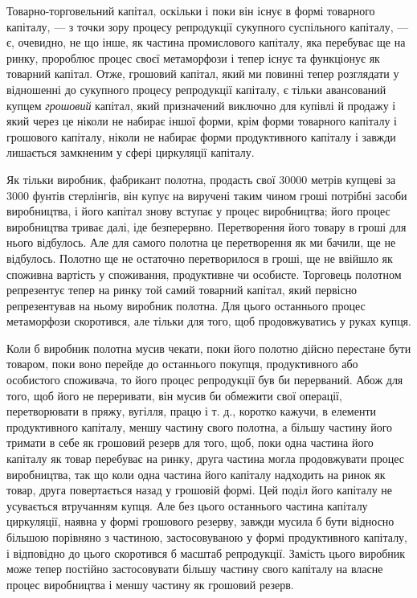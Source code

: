 Товарно-торговельний капітал, оскільки і поки він існує в формі
товарного капіталу, — з точки зору процесу репродукції сукупного суспільного капіталу, — є,
очевидно, не що інше, як
частина промислового капіталу, яка перебуває ще на ринку,
пророблює процес своєї метаморфози і тепер існує та функціонує як товарний капітал. Отже, грошовий
капітал, який ми
повинні тепер розглядати у відношенні до сукупного процесу
репродукції капіталу, є тільки авансований купцем \emph{грошовий}
капітал, який призначений виключно для купівлі й продажу
і який через це ніколи не набирає іншої форми, крім форми товарного капіталу і грошового капіталу,
ніколи не набирає форми
продуктивного капіталу і завжди лишається замкненим у сфері
циркуляції капіталу.

Як тільки виробник, фабрикант полотна, продасть свої 30000
метрів купцеві за 3000 фунтів стерлінгів, він купує на виручені таким чином гроші потрібні засоби
виробництва, і його капітал
знову вступає у процес виробництва; його процес виробництва
триває далі, іде безперервно. Перетворення його товару в гроші
для нього відбулось. Але для самого полотна це перетворення
як ми бачили, ще не відбулось. Полотно ще не остаточно перетворилося
в гроші, ще не ввійшло як споживна вартість у споживання,
продуктивне чи особисте. Торговець полотном репрезентує
тепер на ринку той самий товарний капітал, який первісно
репрезентував на ньому виробник полотна. Для цього
останнього процес метаморфози скоротився, але тільки для того,
щоб продовжуватись у руках купця.

Коли б виробник полотна мусив чекати, поки його полотно
дійсно перестане бути товаром, поки воно перейде до останнього
покупця, продуктивного або особистого споживача, то
його процес репродукції був би перерваний. Абож для того, щоб
його не переривати, він мусив би обмежити свої операції, перетворювати
в пряжу, вугілля, працю і т. д., коротко кажучи,
в елементи продуктивного капіталу, меншу частину свого полотна,
а більшу частину його тримати в себе як грошовий резерв
для того, щоб, поки одна частина його капіталу як товар
перебуває на ринку, друга частина могла продовжувати процес
виробництва, так що коли одна частина його капіталу надходить
на ринок як товар, друга повертається назад у грошовій
формі. Цей поділ його капіталу не усувається втручанням купця.
Але без цього останнього частина капіталу циркуляції, наявна
у формі грошового резерву, завжди мусила б бути відносно
більшою порівняно з частиною, застосовуваною у формі продуктивного
капіталу, і відповідно до цього скоротився б масштаб
репродукції. Замість цього виробник може тепер постійно
застосовувати більшу частину свого капіталу на власне процес
виробництва і меншу частину як грошовий резерв.


